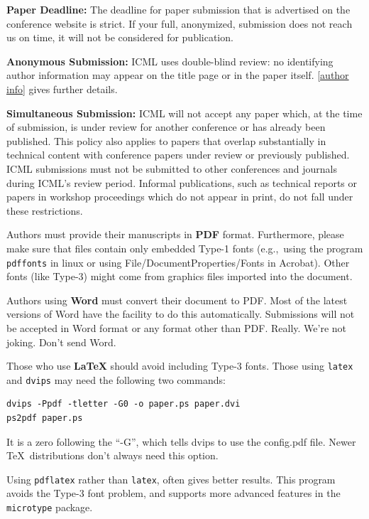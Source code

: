 \documentclass[nohyperref]{article}
\theoremstyle{plain}
\theoremstyle{definition}
\theoremstyle{remark}
\begin{document}
\textbf{Paper Deadline:} The deadline for paper submission that is
advertised on the conference website is strict. If your full,
anonymized, submission does not reach us on time, it will not be
considered for publication. 

\textbf{Anonymous Submission:} ICML uses double-blind review: no identifying
author information may appear on the title page or in the paper
itself. \cref{author info} gives further details.

\textbf{Simultaneous Submission:} ICML will not accept any paper which,
at the time of submission, is under review for another conference or
has already been published. This policy also applies to papers that
overlap substantially in technical content with conference papers
under review or previously published. ICML submissions must not be
submitted to other conferences and journals during ICML's review
period.
Informal publications, such as technical
reports or papers in workshop proceedings which do not appear in
print, do not fall under these restrictions.

\medskip

Authors must provide their manuscripts in \textbf{PDF} format.
Furthermore, please make sure that files contain only embedded Type-1 fonts
(e.g.,~using the program \texttt{pdffonts} in linux or using
File/DocumentProperties/Fonts in Acrobat). Other fonts (like Type-3)
might come from graphics files imported into the document.

Authors using \textbf{Word} must convert their document to PDF\@. Most
of the latest versions of Word have the facility to do this
automatically. Submissions will not be accepted in Word format or any
format other than PDF\@. Really. We're not joking. Don't send Word.

Those who use \textbf{\LaTeX} should avoid including Type-3 fonts.
Those using \texttt{latex} and \texttt{dvips} may need the following
two commands:

{\footnotesize
\begin{verbatim}
dvips -Ppdf -tletter -G0 -o paper.ps paper.dvi
ps2pdf paper.ps
\end{verbatim}}
It is a zero following the ``-G'', which tells dvips to use
the config.pdf file. Newer \TeX\ distributions don't always need this
option.

Using \texttt{pdflatex} rather than \texttt{latex}, often gives better
results. This program avoids the Type-3 font problem, and supports more
advanced features in the \texttt{microtype} package.
\end{document}

